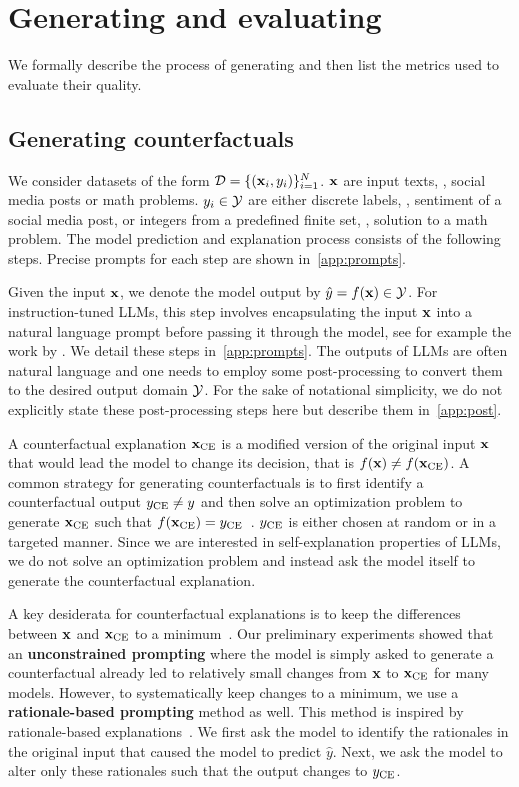 \section{Generating and evaluating \SCEs}


We formally describe the process of generating \SCEs and then list the metrics used to evaluate their quality.

\subsection{Generating counterfactuals}
\label{sec:ce_gen}
We consider datasets of the form $\mathcal{D} = \{(\mathbf{x}_i, y_i)\}_{i=1}^N$. $\mathbf{x}$ are input texts, \eg, social media posts or math problems. $y_i \in \mathcal{Y}$ are either discrete labels, \eg, sentiment of a social media post, or integers from a predefined finite set, \eg, solution to a math problem. The model prediction and explanation process consists of the following steps.
Precise prompts for each step are shown in~\autoref{app:prompts}.


 Given the input $\mathbf{x}$, we denote the model output by $\hat{y} = f(\mathbf{x}) \in \mathcal{Y}$. For instruction-tuned LLMs, this step involves encapsulating the input $\mathbf{x}$ into a natural language prompt before passing it through the model, see for example  the work by \citet{dubey2024llama}. We detail these steps in~\autoref{app:prompts}. The outputs of LLMs are often natural language and one needs to employ some post-processing to convert them to the desired output domain $\mathcal{Y}$. For the sake of notational simplicity, we do not explicitly state these post-processing steps here but describe them in~\autoref{app:post}. 

A counterfactual explanation $\mathbf{x}_{\text{CE}}$ is a modified version of the original input $\mathbf{x}$ that would lead the model to change its decision, that is $f(\mathbf{x}) \neq f(\mathbf{x}_{\text{CE}})$.
A common strategy for generating counterfactuals is to first identify a counterfactual output $y_{\text{CE}} \neq y$ and then solve an optimization problem to generate $\mathbf{x}_{\text{CE}}$ such that $f(\mathbf{x}_{\text{CE}}) = y_{\text{CE}}$~\cite{wachter2017counterfactual, mothilal2020explaining, verma2024counterfactual}. $y_{\text{CE}}$ is either chosen at random or in a targeted manner.
Since we are interested in self-explanation properties of LLMs, we do not solve an optimization problem and instead ask the model itself to generate the counterfactual explanation. 

A key desiderata for counterfactual explanations is to keep the differences between $\mathbf{x}$ and $\mathbf{x}_{\text{CE}}$ to a minimum~\cite{verma2024counterfactual}. Our preliminary experiments showed that an \textbf{unconstrained prompting} where the model is simply asked to generate a counterfactual already led to relatively small changes from $\mathbf{x}$ to $\mathbf{x}_{\text{CE}}$ for many models. However, to systematically keep changes to a minimum, we use a \textbf{rationale-based prompting} method as well. This method is inspired by rationale-based explanations~\cite{deyoung2019eraser}. We first ask the model to identify the rationales in the original input that caused the model to predict $\hat{y}$. Next, we ask the model to alter only these rationales such that the output changes to $y_{\text{CE}}$.

